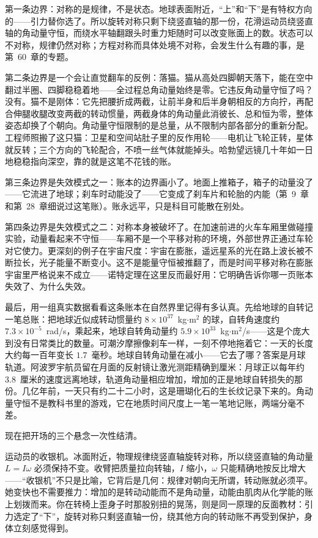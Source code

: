 
第一条边界：对称的是规律，不是状态。地球表面附近，“上”和“下”是有特权方向的——引力替你选了。所以旋转对称只剩下绕竖直轴的那一份，花滑运动员绕竖直轴的角动量守恒，而绕水平轴翻跟头时重力矩随时可以改变账面上的数。状态可以不对称，规律仍然对称；方程对称而具体处境不对称，会发生什么有趣的事，是第~60~章的专题。

第二条边界是一个会让直觉翻车的反例：落猫。猫从高处四脚朝天落下，能在空中翻过半圈、四脚稳稳着地——全过程总角动量始终是零。它违反角动量守恒了吗？没有。猫不是刚体：它先把腰折成两截，让前半身和后半身朝相反的方向拧，再配合伸腿收腿改变两截的转动惯量，两截身体的角动量此消彼长、总和恒为零，整体姿态却换了个朝向。角动量守恒限制的是总量，从不限制内部各部分的重新分配。工程师照搬了这只猫：卫星和空间站肚子里的反作用轮——电机让飞轮正转，星体就反转；三个方向的飞轮配合，不喷一丝气体就能掉头。哈勃望远镜几十年如一日地稳稳指向深空，靠的就是这笔不花钱的账。

第三条边界是失效模式之一：账本的边界画小了。地面上推箱子，箱子的动量没了——它流进了地球；刹车时动能没了——它变成了刹车片和轮胎的内能（第~9~章和第~28~章细说过这笔账）。账永远平，只是科目可能散在别处。

第四条边界是失效模式之二：对称本身被破坏了。在加速前进的火车车厢里做碰撞实验，动量看起来不守恒——车厢不是一个平移对称的环境，外部世界正通过车轮对它使力。更深刻的例子在宇宙尺度：宇宙在膨胀，遥远星系的光在路上波长被不断拉长，光子能量不断变小。这不是能量守恒被推翻了，而是时间平移对称在膨胀宇宙里严格说来不成立——诺特定理在这里反而最好用：它明确告诉你哪一页账本失效了、为什么失效。

最后，用一组真实数据看看这条账本在自然界里记得有多认真。先给地球的自转记一笔总账：把地球近似成转动惯量约 \(8\times10^{37}\)~kg\(\cdot\)m\(^2\) 的球，自转角速度约 \(7.3\times10^{-5}\)~rad/s，乘起来，地球自转角动量约 \(5.9\times10^{33}\)~kg\(\cdot\)m\(^2\)/s——这是个庞大到没有日常类比的数量。可潮汐摩擦像刹车一样，一刻不停地拖着它：一天的长度大约每一百年变长 \(1.7\)~毫秒。地球自转角动量在减小——它去了哪？答案是月球轨道。阿波罗宇航员留在月面的反射镜让激光测距精确到厘米：月球正以每年约 \(3.8\)~厘米的速度远离地球，轨道角动量相应增加，增加的正是地球自转损失的那份。几亿年前，一天只有约二十二小时，这是珊瑚化石的生长纹记录下来的。角动量守恒不是教科书里的游戏，它在地质时间尺度上一笔一笔地记账，两端分毫不差。


现在把开场的三个悬念一次性结清。

运动员的收银机。冰面附近，物理规律绕竖直轴旋转对称，所以绕竖直轴的角动量 \(L=I\omega\) 必须保持不变。收臂把质量拉向转轴，\(I\) 缩小，\(\omega\) 只能精确地按反比增大——“收银机”不只是比喻，它背后是几何：规律对朝向无所谓，转动账就必须平。她变快也不需要推力：增加的是转动动能而不是角动量，动能由肌肉从化学能的账上划拨而来。你在转椅上歪身子时那股别扭的晃荡，则是同一原理的反面教材：引力选定了“下”，旋转对称只剩竖直轴一份，绕其他方向的转动账不再受到保护，身体立刻感觉得到。

